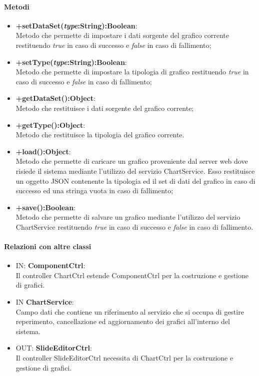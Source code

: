 	\paragraph{Metodi}
	\begin{itemize}
	\item \textbf{+setDataSet(\textit{type}:String):Boolean}:\\
		Metodo che permette di impostare i dati sorgente del grafico corrente restituendo \textit{true} in caso di successo e \textit{false} in caso di fallimento;
	\item \textbf{+setType(\textit{type}:String):Boolean}:\\
		Metodo che permette di impostare la tipologia di grafico restituendo \textit{true} in caso di successo e \textit{false} in caso di fallimento;
	\item \textbf{+getDataSet():Object}:\\
		Metodo che restituisce i dati sorgente del grafico corrente;
	\item \textbf{+getType():Object}:\\
		Metodo che restituisce la tipologia del grafico corrente.
	\item \textbf{+load():Object}:\\	
		Metodo che permette di caricare un grafico proveniente dal server web dove risiede il sistema mediante l'utilizzo del servizio ChartService. Esso restituisce un oggetto JSON contenente la tipologia ed il set di dati del grafico in caso di successo ed una stringa vuota in caso di fallimento;
	\item \textbf{+save():Boolean}:\\	
		Metodo che permette di salvare un grafico mediante l'utilizzo del servizio ChartService restituendo \textit{true} in caso di successo e \textit{false} in caso di fallimento.
	
	\end{itemize}
	\paragraph{Relazioni con altre classi}
	\begin{itemize}
 	\item IN: \textbf{ComponentCtrl}:\\
	 	Il controller ChartCtrl estende ComponentCtrl per la costruzione e gestione di grafici.
	\item IN \textbf{ChartService}:\\
		Campo dati che contiene un riferimento al servizio che si occupa di gestire reperimento, cancellazione ed aggiornamento dei grafici all'interno del sistema.
 	\item OUT: \textbf{SlideEditorCtrl}:\\
	 	Il controller SlideEditorCtrl necessita di ChartCtrl per la costruzione e gestione di grafici.
	\end{itemize}

